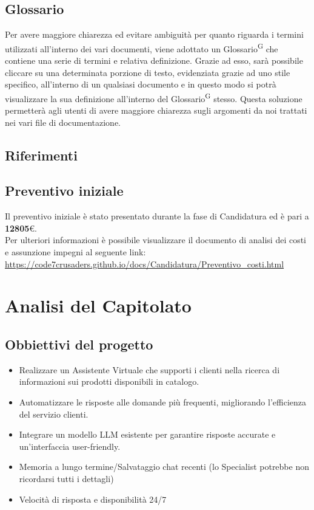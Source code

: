 \documentclass{article}
\begin{document}
    \subsection{Glossario}
    Per avere maggiore chiarezza ed evitare ambiguità per quanto riguarda i termini utilizzati all'interno dei vari documenti,
    viene adottato un Glossario\textsuperscript{G} che contiene una serie di termini e relativa definizione.
    Grazie ad esso, sarà possibile cliccare su una determinata porzione di testo, evidenziata grazie ad uno stile specifico, 
    all'interno di un qualsiasi documento e in questo modo si potrà visualizzare la sua definizione all'interno
    del Glossario\textsuperscript{G} stesso. Questa soluzione permetterà agli utenti di avere maggiore chiarezza sugli argomenti da noi 
    trattati nei vari file di documentazione.

    \subsection{Riferimenti}

    \subsection{Preventivo iniziale}
    Il preventivo iniziale è stato presentato durante la fase di Candidatura ed è pari a \textbf{12805}\euro.
    \\ Per ulteriori informazioni è possibile visualizzare il documento di analisi dei costi e assunzione impegni al seguente link:
    \\ \url{https://code7crusaders.github.io/docs/Candidatura/Preventivo_costi.html}




\newpage
\section{Analisi del Capitolato}
    \subsection{Obbiettivi del progetto}
    \begin{itemize}
        \item Realizzare un Assistente Virtuale che supporti i clienti nella ricerca 
        di informazioni sui prodotti disponibili in catalogo.
        \item Automatizzare le risposte alle domande più frequenti, migliorando 
        l'efficienza del servizio clienti.
        \item Integrare un modello LLM esistente per garantire risposte accurate e 
        un'interfaccia user-friendly.
        \item Memoria a lungo termine/Salvataggio chat recenti (lo Specialist
        potrebbe non ricordarsi tutti i dettagli)
        \item Velocità di risposta e disponibilità 24/7
    \end{itemize}
\end{document}
